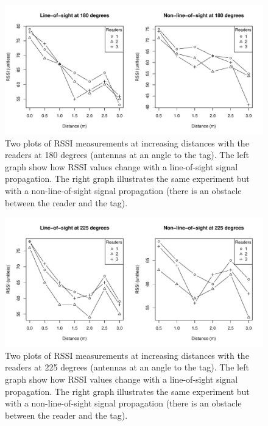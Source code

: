 \begin{figure}
	\begin{center}
		\includegraphics[width=1\textwidth]{figures/rssi_distance_3m_180deg}
		\caption{Two plots of RSSI measurements at increasing distances with the readers at 180 degrees (antennas at an angle to the tag). The left graph show how RSSI values change with a line-of-sight signal propagation. The right graph illustrates the same experiment but with a non-line-of-sight signal propagation (there is an obstacle between the reader and the tag).}
	\end{center}
\end{figure}
\begin{figure}
	\begin{center}
		\includegraphics[width=1\textwidth]{figures/rssi_distance_3m_225deg}
		\caption{Two plots of RSSI measurements at increasing distances with the readers at 225 degrees (antennas at an angle to the tag). The left graph show how RSSI values change with a line-of-sight signal propagation. The right graph illustrates the same experiment but with a non-line-of-sight signal propagation (there is an obstacle between the reader and the tag).}
	\end{center}
\end{figure}
